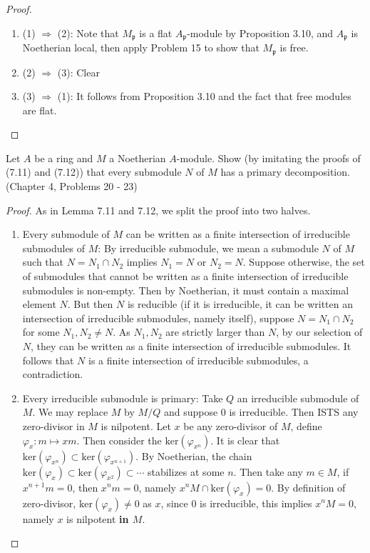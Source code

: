 \documentclass{solution}
\begin{document}
\begin{proof}
    \begin{enumerate}
        \item (1) $\Rightarrow$ (2): Note that $M_{\mathfrak{p}}$ is a flat $A_{\mathfrak{p}}$-module by Proposition 3.10, and $A_{\mathfrak{p}}$ is Noetherian local, then apply Problem 15 to show that $M_{\mathfrak{p}}$ is free.
        \item (2) $\Rightarrow$ (3): Clear
        \item (3) $\Rightarrow$ (1): It follows from Proposition 3.10 and the fact that free modules are flat.
    \end{enumerate}
\end{proof}

\begin{problem}
    Let $A$ be a ring and $M$ a Noetherian $A$-module. Show (by imitating the proofs of (7.11) and (7.12)) that every submodule $N$ of $M$ has a primary decomposition. (Chapter 4, Problems 20 - 23)
\end{problem}

\begin{proof}
    As in Lemma 7.11 and 7.12, we split the proof into two halves.

    \begin{enumerate}
        \item Every submodule of $M$ can be written as a finite intersection of irreducible submodules of $M$: By irreducible submodule, we mean a submodule $N$ of $M$ such that $N = N_1 \cap N_2$ implies $N_1 = N$ or $N_2 = N$. Suppose otherwise, the set of submodules that cannot be written as a finite intersection of irreducible submodules is non-empty. Then by Noetherian, it must contain a maximal element $N$. But then $N$ is reducible (if it is irreducible, it can be written an intersection of irreducible submodules, namely itself), suppose $N = N_1 \cap N_2$ for some $N_1, N_2 \ne N$. As $N_1, N_2$ are strictly larger than $N$, by our selection of $N$, they can be written as a finite intersection of irreducible submodules. It follows that $N$ is a finite intersection of irreducible submodules, a contradiction.
        \item Every irreducible submodule is primary: Take $Q$ an irreducible submodule of $M$. We may replace $M$ by $M / Q$ and suppose $0$ is irreducible. Then ISTS any zero-divisor in $M$ is nilpotent. Let $x$ be any zero-divisor of $M$, define $\varphi_x: m \mapsto xm$. Then consider the $\mathrm{ker}(\varphi_{x^n})$. It is clear that $\mathrm{ker}(\varphi_{x^n}) \subset \mathrm{ker}(\varphi_{x^{n + 1}})$. By Noetherian, the chain $\mathrm{ker}(\varphi_{x}) \subset \mathrm{ker}(\varphi_{x^2}) \subset \cdots$ stabilizes at some $n$. Then take any $m \in M$, if $x^{n + 1} m = 0$, then $x^n m = 0$, namely $x^nM \cap \mathrm{ker}(\varphi_x) = 0$. By definition of zero-divisor, $\mathrm{ker}(\varphi_x) \ne 0$ as $x$, since $0$ is irreducible, this implies $x^nM = 0$, namely $x$ is nilpotent \textbf{in $M$}.
    \end{enumerate}
\end{proof}
\end{document}

